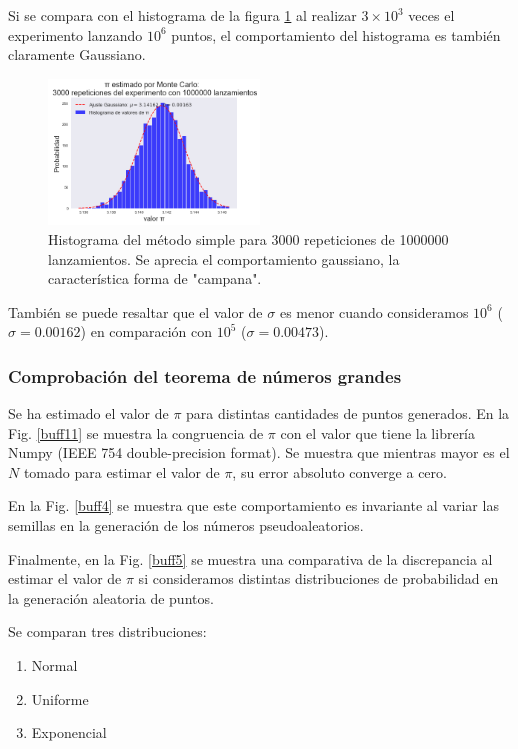 \documentclass{rbf}
\begin{document}
Si se compara con el histograma de la figura \ref{buff3} al realizar $3 \times 10^3$ veces el experimento lanzando $10^6$ puntos, el comportamiento del histograma es también claramente Gaussiano.

\begin{figure}[tbp!]
 \centering
  \includegraphics[width=0.5\textwidth]{figures/3000rep1e6.png}
	\caption{Histograma del método simple para 3000 repeticiones de 1000000 lanzamientos. Se aprecia el comportamiento gaussiano, la característica forma de "campana".}
 \label{buff3}
\end{figure}

También se puede resaltar que el valor de $\sigma$ es menor cuando consideramos $10^6$ ($\sigma=0.00162$) en comparación con $10^5$ ($\sigma=0.00473$). 

\subsubsection{Comprobación del teorema de números grandes}

Se ha estimado el valor de $\pi$ para distintas cantidades de puntos generados. En la Fig. \ref{buff11} se muestra la congruencia de $\pi$ con el valor que tiene la librería Numpy (IEEE 754 double-precision format). Se muestra que mientras mayor es el $N$ tomado para estimar el valor de $\pi$, su error absoluto converge a cero.


En la Fig. \ref{buff4} se muestra que este comportamiento es invariante al variar las semillas en la generación de los números pseudoaleatorios. 


Finalmente, en la Fig. \ref{buff5} se muestra una comparativa de la discrepancia al estimar el valor de $\pi$ si consideramos distintas distribuciones de probabilidad en la generación aleatoria de puntos.

Se comparan tres distribuciones:
\begin{enumerate}
    \item Normal
    \item Uniforme
    \item Exponencial
\end{enumerate}
\end{document}
